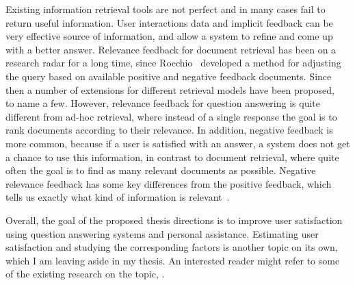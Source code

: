 Existing information retrieval tools are not perfect and in many cases fail to return useful information.
User interactions data and implicit feedback can be very effective source of information, and allow a system to refine and come up with a better answer.
Relevance feedback for document retrieval has been on a research radar for a long time, since Rocchio~\cite{rocchio1971relevance} developed a method for adjusting the query based on available positive and negative feedback documents.
Since then a number of extensions for different retrieval models have been proposed, \eg ~\cite{salton1997improving,lavrenko2001relevance,lv2010positional,hiemstra2001relevance} to name a few.
However, relevance feedback for question answering is quite different from ad-hoc retrieval, where instead of a single response the goal is to rank documents according to their relevance.
In addition, negative feedback is more common, because if a user is satisfied with an answer, a system does not get a chance to use this information, in contrast to document retrieval, where quite often the goal is to find as many relevant documents as possible.
Negative relevance feedback has some key differences from the positive feedback, which tells us exactly what kind of information is relevant~\cite{wang2008study}.

Overall, the goal of the proposed thesis directions is to improve user satisfaction using question answering systems and personal assistance.
Estimating user satisfaction and studying the corresponding factors is another topic on its own, which I am leaving aside in my thesis.
An interested reader might refer to some of the existing research on the topic, \eg \cite{ong2009measurement,Liu:2008:PIS:1390334.1390417,kiseleva2016understanding}.
